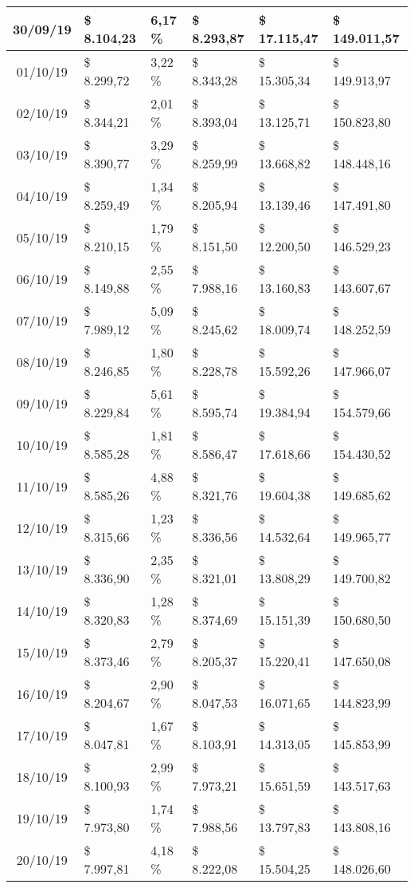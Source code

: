 \begin{small}
\begin{longtable}{|c|l|l|l|l|l|}
30/09/19 & \$ 8.104,23 & 6,17 \% & \$ 8.293,87 & \$ 17.115,47 & \$ 149.011,57 \\ \hline
01/10/19 & \$ 8.299,72 & 3,22 \% & \$ 8.343,28 & \$ 15.305,34 & \$ 149.913,97 \\ \hline
02/10/19 & \$ 8.344,21 & 2,01 \% & \$ 8.393,04 & \$ 13.125,71 & \$ 150.823,80 \\ \hline
03/10/19 & \$ 8.390,77 & 3,29 \% & \$ 8.259,99 & \$ 13.668,82 & \$ 148.448,16 \\ \hline
04/10/19 & \$ 8.259,49 & 1,34 \% & \$ 8.205,94 & \$ 13.139,46 & \$ 147.491,80 \\ \hline
05/10/19 & \$ 8.210,15 & 1,79 \% & \$ 8.151,50 & \$ 12.200,50 & \$ 146.529,23 \\ \hline
06/10/19 & \$ 8.149,88 & 2,55 \% & \$ 7.988,16 & \$ 13.160,83 & \$ 143.607,67 \\ \hline
07/10/19 & \$ 7.989,12 & 5,09 \% & \$ 8.245,62 & \$ 18.009,74 & \$ 148.252,59 \\ \hline
08/10/19 & \$ 8.246,85 & 1,80 \% & \$ 8.228,78 & \$ 15.592,26 & \$ 147.966,07 \\ \hline
09/10/19 & \$ 8.229,84 & 5,61 \% & \$ 8.595,74 & \$ 19.384,94 & \$ 154.579,66 \\ \hline
10/10/19 & \$ 8.585,28 & 1,81 \% & \$ 8.586,47 & \$ 17.618,66 & \$ 154.430,52 \\ \hline
11/10/19 & \$ 8.585,26 & 4,88 \% & \$ 8.321,76 & \$ 19.604,38 & \$ 149.685,62 \\ \hline
12/10/19 & \$ 8.315,66 & 1,23 \% & \$ 8.336,56 & \$ 14.532,64 & \$ 149.965,77 \\ \hline
13/10/19 & \$ 8.336,90 & 2,35 \% & \$ 8.321,01 & \$ 13.808,29 & \$ 149.700,82 \\ \hline
14/10/19 & \$ 8.320,83 & 1,28 \% & \$ 8.374,69 & \$ 15.151,39 & \$ 150.680,50 \\ \hline
15/10/19 & \$ 8.373,46 & 2,79 \% & \$ 8.205,37 & \$ 15.220,41 & \$ 147.650,08 \\ \hline
16/10/19 & \$ 8.204,67 & 2,90 \% & \$ 8.047,53 & \$ 16.071,65 & \$ 144.823,99 \\ \hline
17/10/19 & \$ 8.047,81 & 1,67 \% & \$ 8.103,91 & \$ 14.313,05 & \$ 145.853,99 \\ \hline
18/10/19 & \$ 8.100,93 & 2,99 \% & \$ 7.973,21 & \$ 15.651,59 & \$ 143.517,63 \\ \hline
19/10/19 & \$ 7.973,80 & 1,74 \% & \$ 7.988,56 & \$ 13.797,83 & \$ 143.808,16 \\ \hline
20/10/19 & \$ 7.997,81 & 4,18 \% & \$ 8.222,08 & \$ 15.504,25 & \$ 148.026,60 \\ \hline

\end{longtable}
\end{small}
